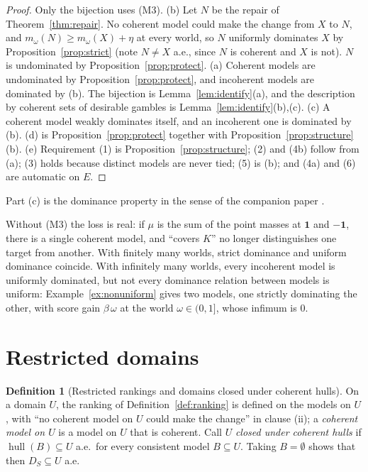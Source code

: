 \documentclass[11pt]{article}
\newcommand{\one}{\mathbf{1}}
\newcommand{\hull}{\operatorname{hull}}
\theoremstyle{plain}
\theoremstyle{definition}
\newtheorem{definition}[theorem]{Definition}
\theoremstyle{remark}
\begin{document}
\begin{proof}
Only the bijection uses (M3). (b) Let $N$ be the repair of Theorem~\ref{thm:repair}. No coherent
model could make the change from $X$ to $N$, and $m_\omega(N)\ge m_\omega(X)+\eta$ at every
world, so $N$ uniformly dominates $X$ by Proposition~\ref{prop:strict} (note $N\ne X$ a.e.,
since $N$ is coherent and $X$ is not). $N$ is undominated by Proposition~\ref{prop:protect}.
(a) Coherent models are undominated by Proposition~\ref{prop:protect}, and incoherent models are
dominated by (b). The bijection is Lemma~\ref{lem:identify}(a), and the description by coherent
sets of desirable gambles is Lemma~\ref{lem:identify}(b),(c). (c) A coherent model weakly
dominates itself, and an incoherent one is dominated by (b). (d) is
Proposition~\ref{prop:protect} together with Proposition~\ref{prop:structure}(b). (e)
Requirement (1) is Proposition~\ref{prop:structure}; (2) and (4b) follow from (a); (3) holds
because distinct models are never tied; (5) is (b); and (4a) and (6) are automatic on $E$.
\end{proof}

Part (c) is the dominance property in the sense of the companion paper \cite{KCMcompanion}.

Without (M3) the loss is real: if $\mu$ is the sum of the point masses at $\one$ and $-\one$,
there is a single coherent model, and ``covers $K$'' no longer distinguishes one target from
another. With finitely many worlds, strict dominance and uniform dominance coincide. With infinitely many
worlds, every incoherent model is uniformly dominated, but not every dominance relation between
models is uniform: Example~\ref{ex:nonuniform} gives two models, one strictly dominating the
other, with score gain $\beta\,\omega$ at the world $\omega\in(0,1]$, whose infimum is $0$.

\section{Restricted domains}\label{sec:domains}

\begin{definition}[Restricted rankings and domains closed under coherent hulls]\label{def:restricted-domain}
On a domain $U$, the ranking of Definition~\ref{def:ranking} is defined on the models on $U$,
with ``no coherent model on $U$ could make the change'' in clause (ii); a \emph{coherent model
on $U$} is a model on $U$ that is coherent. Call $U$ \emph{closed under coherent hulls} if
$\hull(B)\subseteq U$ a.e.\ for every consistent model $B\subseteq U$. Taking $B=\emptyset$
shows that then $D_S\subseteq U$ a.e.
\end{definition}
\end{document}
